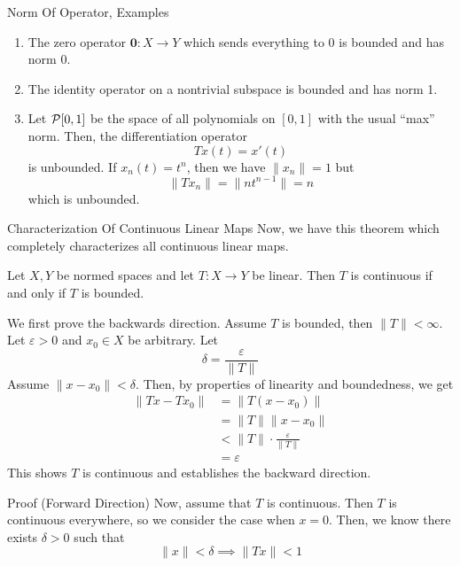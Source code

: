 \documentclass[10pt]{beamer}
\begin{document}
		\begin{frame}{Norm Of Operator, Examples}
				\begin{enumerate}
						\item<1-> The zero operator $\mathbf{0} : X\to Y$ which sends everything to 0 is bounded and has norm 0. 
						\item<2-> The identity operator on a nontrivial subspace is bounded and has norm 1. 
						\item<3-> Let $\mathcal{P}[0, 1]$ be the space of all polynomials on $[0, 1]$ with the usual ``max'' norm. Then, the differentiation operator 
								\begin{equation*}
										Tx(t) = x'(t)
								\end{equation*}
								is unbounded. If $x_n(t) = t^n$, then we have $\|x_n\| = 1$ but 
								\begin{equation*}
										\|Tx_n\| = \|nt^{n-1}\| = n
								\end{equation*}
								which is unbounded.
				\end{enumerate}
		\end{frame}

		\begin{frame}{Characterization Of Continuous Linear Maps}
				\small
				Now, we have this theorem which completely characterizes all continuous linear maps. 
				\begin{theorem}[]
						Let $X,Y$ be normed spaces and let $T: X\to Y$ be linear. Then $T$ is continuous if and only if $T$ is bounded.
				\end{theorem}
				We first prove the backwards direction. Assume $T$ is bounded, then $\|T\| < \infty$. Let $\varepsilon > 0$ and $x_0\in X$ be arbitrary. Let 
				\begin{equation*}
						\delta = \frac{\varepsilon}{\|T\|}
				\end{equation*}
				Assume $\|x - x_0\| < \delta$. Then, by properties of linearity and boundedness, we get 
				\begin{align*}
						\|Tx - Tx_0\| &= \|T(x - x_0)\| \\ 
													&= \|T\|\|x - x_0\| \\ 
													&< \|T\| \cdot \frac{\varepsilon}{\|T\|} \\ 
													&= \varepsilon
				\end{align*}
				This shows $T$ is continuous and establishes the backward direction.
		\end{frame}

		\begin{frame}{Proof (Forward Direction)}
				Now, assume that $T$ is continuous. Then $T$ is continuous everywhere, so we consider the case when $x = 0$. Then, we know there exists $\delta > 0$ such that 
				\begin{equation*}
						\|x\| < \delta \implies \|Tx\| < 1
				\end{equation*}
		\end{frame}
\end{document}
